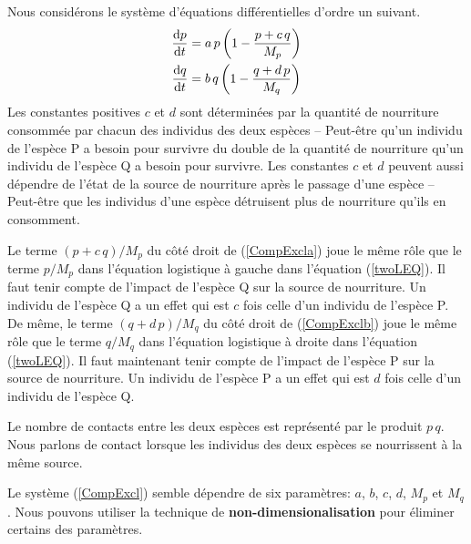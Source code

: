 {\begin{egg}
Nous considérons le système d'équations différentielles d'ordre un suivant.
\begin{subequations} \label{CompExcl}
\begin{align}
\frac{\mathrm{d}p}{\mathrm{d}t} &= a\,p\left(1- \frac{p + c\, q}{M_p} \right) \label{CompExcla} \\
\frac{\mathrm{d}q}{\mathrm{d}t} &= b\,q\left(1- \frac{q + d\, p}{M_q} \right) \label{CompExclb}
\end{align}
\end{subequations}
Les constantes positives $c$ et $d$ sont déterminées par la quantité de
nourriture consommée par chacun des individus des deux espèces -- Peut-être
qu'un individu de l'espèce P a besoin pour survivre du double de la quantité
de nourriture qu'un individu de l'espèce Q a besoin pour survivre.  Les
constantes $c$ et $d$ peuvent aussi dépendre de l'état de la source de
nourriture après le passage d'une espèce -- Peut-être que les individus d'une
espèce détruisent plus de nourriture qu'ils en consomment.

Le terme $(p+c\,q)/M_p$ du côté droit de (\ref{CompExcla}) joue le
même rôle que le terme $p/M_p$ dans l'équation logistique à gauche
dans l'équation (\ref{twoLEQ}).  Il faut tenir compte de l'impact de
l'espèce Q sur la source de nourriture.  Un individu de l'espèce Q a
un effet qui est $c$ fois celle d'un individu de l'espèce P.  De même,
le terme $(q+d\,p)/M_q$ du côté droit de (\ref{CompExclb}) joue le
même rôle que le terme $q/M_q$ dans l'équation logistique à droite
dans l'équation (\ref{twoLEQ}).  Il faut maintenant tenir compte de
l'impact de l'espèce P sur la source de nourriture.  Un individu de
l'espèce P a un effet qui est $d$ fois celle d'un individu de l'espèce
Q.

Le nombre de contacts entre les deux espèces est représenté par le produit
$p\,q$.  Nous parlons de contact lorsque les individus des deux espèces se
nourrissent à la même source.

Le système (\ref{CompExcl}) semble dépendre de six paramètres: $a$, $b$, $c$,
$d$, $M_p$ et $M_q$.  Nous pouvons utiliser la technique de
{\bfseries non-dimensionalisation} pour éliminer certains des
paramètres.


\end{egg}}
